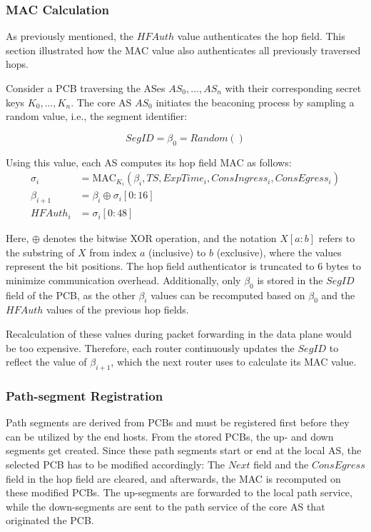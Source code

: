 \subsubsection{MAC Calculation}
\label{sec:mac_calc}
As previously mentioned, the $HFAuth$ value authenticates the hop field.
This section illustrated how the MAC value also authenticates all previously traversed hops.

Consider a PCB traversing the ASes $AS_0, \dots, AS_n$ with their corresponding secret keys $K_0, \dots, K_n$.
The core AS $AS_0$ initiates the beaconing process by sampling a random value, i.e., the segment identifier:

$$ SegID = \beta_0 = Random() $$

Using this value, each AS computes its hop field MAC as follows:
\begin{align*}
    \sigma_i    &= \text{MAC}_{K_i}(\beta_i, TS, ExpTime_i, ConsIngress_i, ConsEgress_i) \\
    \beta_{i+1} &= \beta_i \oplus \sigma_i[0:16] \\
    HFAuth_i &= \sigma_i[0:48]
\end{align*}

Here, $\oplus$ denotes the bitwise XOR operation, and the notation $X[a:b]$ refers to the substring of $X$ from index $a$ (inclusive) to $b$ (exclusive), where the values represent the bit positions.
The hop field authenticator is truncated to 6 bytes to minimize communication overhead.
Additionally, only $\beta_0$ is stored in the $SegID$ field of the PCB, as the other $\beta_i$ values can be recomputed based on $\beta_0$ and the $HFAuth$ values of the previous hop fields.

Recalculation of these values during packet forwarding in the data plane would be too expensive.
Therefore, each router continuously updates the $SegID$ to reflect the value of $\beta_{i+1}$, which the next router uses to calculate its MAC value.

\subsubsection{Path-segment Registration}
Path segments are derived from PCBs and must be registered first before they can be utilized by the end hosts.
From the stored PCBs, the up- and down segments get created.
Since these path segments start or end at the local AS, the selected PCB has to be modified accordingly:
The $Next$ field and the $ConsEgress$ field in the hop field are cleared, and afterwards, the MAC is recomputed on these modified PCBs.
The up-segments are forwarded to the local path service, while the down-segments are sent to the path service of the core AS that originated the PCB.

